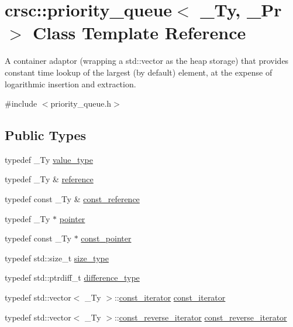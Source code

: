 \hypertarget{classcrsc_1_1priority__queue}{}\section{crsc\+:\+:priority\+\_\+queue$<$ \+\_\+\+Ty, \+\_\+\+Pr $>$ Class Template Reference}
\label{classcrsc_1_1priority__queue}


A container adaptor (wrapping a {\ttfamily std\+::vector} as the heap storage) that provides constant time lookup of the largest (by default) element, at the expense of logarithmic insertion and extraction.  




{\ttfamily \#include $<$priority\+\_\+queue.\+h$>$}

\subsection*{Public Types}
\begin{DoxyCompactItemize}
\item 
typedef \+\_\+\+Ty \hyperlink{classcrsc_1_1priority__queue_a2a7d77c9465b6c918f67021e6eb926d7}{value\+\_\+type}
\item 
typedef \+\_\+\+Ty \& \hyperlink{classcrsc_1_1priority__queue_a2e667696d4a803d1a273fbd838cd6745}{reference}
\item 
typedef const \+\_\+\+Ty \& \hyperlink{classcrsc_1_1priority__queue_a654551a6a31b69c37ee6bac13b22d262}{const\+\_\+reference}
\item 
typedef \+\_\+\+Ty $\ast$ \hyperlink{classcrsc_1_1priority__queue_a6e6c3d342ac5217f91a33f480f626af5}{pointer}
\item 
typedef const \+\_\+\+Ty $\ast$ \hyperlink{classcrsc_1_1priority__queue_aeeaf3b92bbdb4475f0262588875e74b4}{const\+\_\+pointer}
\item 
typedef std\+::size\+\_\+t \hyperlink{classcrsc_1_1priority__queue_a2b1c9a55084026111d70a4fe869e0fbe}{size\+\_\+type}
\item 
typedef std\+::ptrdiff\+\_\+t \hyperlink{classcrsc_1_1priority__queue_a859155ca3fdb5d55d136bf6758630a39}{difference\+\_\+type}
\item 
typedef std\+::vector$<$ \+\_\+\+Ty $>$\+::\hyperlink{classcrsc_1_1priority__queue_a35736d93262db4fdd6d4a71bf785f9b9}{const\+\_\+iterator} \hyperlink{classcrsc_1_1priority__queue_a35736d93262db4fdd6d4a71bf785f9b9}{const\+\_\+iterator}
\item 
typedef std\+::vector$<$ \+\_\+\+Ty $>$\+::\hyperlink{classcrsc_1_1priority__queue_a8f8f07cb4cbb172b421ff41867fbcfb9}{const\+\_\+reverse\+\_\+iterator} \hyperlink{classcrsc_1_1priority__queue_a8f8f07cb4cbb172b421ff41867fbcfb9}{const\+\_\+reverse\+\_\+iterator}
\end{DoxyCompactItemize}
